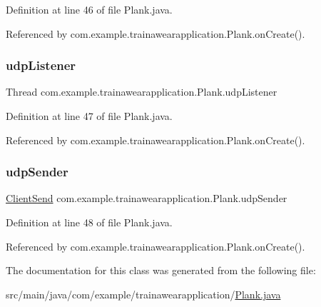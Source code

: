 Definition at line 46 of file Plank.\+java.



Referenced by com.\+example.\+trainawearapplication.\+Plank.\+on\+Create().

\mbox{\label{classcom_1_1example_1_1trainawearapplication_1_1_plank_ac43cc854533c5fc22b5638149d26512c}} 
\subsubsection{\texorpdfstring{udpListener}{udpListener}}
{\footnotesize\ttfamily Thread com.\+example.\+trainawearapplication.\+Plank.\+udp\+Listener\hspace{0.3cm}{\ttfamily [private]}}



Definition at line 47 of file Plank.\+java.



Referenced by com.\+example.\+trainawearapplication.\+Plank.\+on\+Create().

\mbox{\label{classcom_1_1example_1_1trainawearapplication_1_1_plank_a840985b7a4ec5f3092c91a8336e616e9}} 
\subsubsection{\texorpdfstring{udpSender}{udpSender}}
{\footnotesize\ttfamily \mbox{\hyperlink{classcom_1_1example_1_1trainawearapplication_1_1_client_send}{Client\+Send}} com.\+example.\+trainawearapplication.\+Plank.\+udp\+Sender\hspace{0.3cm}{\ttfamily [private]}}



Definition at line 48 of file Plank.\+java.



Referenced by com.\+example.\+trainawearapplication.\+Plank.\+on\+Create().



The documentation for this class was generated from the following file\+:\begin{DoxyCompactItemize}
\item 
src/main/java/com/example/trainawearapplication/\mbox{\hyperlink{_plank_8java}{Plank.\+java}}\end{DoxyCompactItemize}
